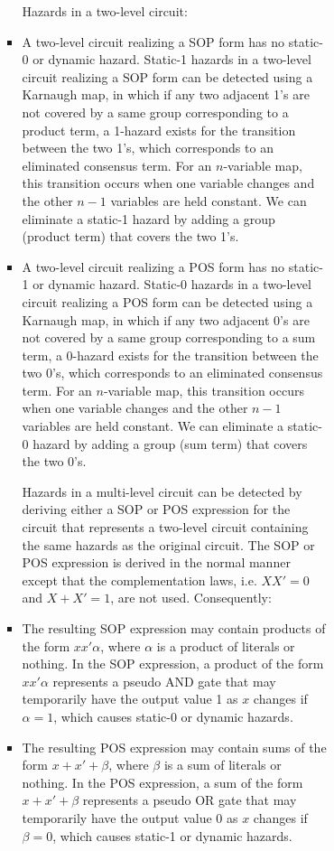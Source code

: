 \documentclass[a4paper,12pt]{article}
\begin{document}
\begin{itemize}
\begin{itemize}
\begin{itemize}
\begin{itemize}
\begin{itemize}
\begin{itemize}
\begin{itemize}
Hazards in a two-level circuit:
\bit
\item A two-level circuit realizing a SOP form has no static-0 or dynamic hazard. Static-1 hazards in a two-level circuit realizing a SOP form can be detected using a Karnaugh map, in which if any two adjacent 1's are not covered by a same group corresponding to a product term, a 1-hazard exists for the transition between the two 1's, which corresponds to an eliminated consensus term. For an $n$-variable map, this transition occurs when one variable changes and the other $n-1$ variables are held constant. We can eliminate a static-1 hazard by adding a group (product term) that covers the two 1's.
\item A two-level circuit realizing a POS form has no static-1 or dynamic hazard. Static-0 hazards in a two-level circuit realizing a POS form can be detected using a Karnaugh map, in which if any two adjacent 0's are not covered by a same group corresponding to a sum term, a 0-hazard exists for the transition between the two 0's, which corresponds to an eliminated consensus term. For an $n$-variable map, this transition occurs when one variable changes and the other $n-1$ variables are held constant. We can eliminate a static-0 hazard by adding a group (sum term) that covers the two 0's.
\eit

Hazards in a multi-level circuit can be detected by deriving either a SOP or POS expression for the circuit that represents a two-level circuit containing the same hazards as the original circuit. The SOP or POS expression is derived in the normal manner except that the complementation laws, i.e. $XX'=0$ and $X+X'=1$, are not used. Consequently:
\bit
\item The resulting SOP expression may contain products of the form $xx'\alpha$, where $\alpha$ is a product of literals or nothing. In the SOP expression, a product of the form $xx'\alpha$ represents a pseudo AND gate that may temporarily have the output value 1 as $x$ changes if $\alpha=1$, which causes static-0 or dynamic hazards.
\item The resulting POS expression may contain sums of the form $x+x'+\beta$, where $\beta$ is a sum of literals or nothing. In the POS expression, a sum of the form $x+x'+\beta$ represents a pseudo OR gate that may temporarily have the output value 0 as $x$ changes if $\beta=0$, which causes static-1 or dynamic hazards.
\eit


\end{itemize}
\end{itemize}
\end{itemize}
\end{itemize}
\end{itemize}
\end{itemize}
\end{itemize}
\end{document}

